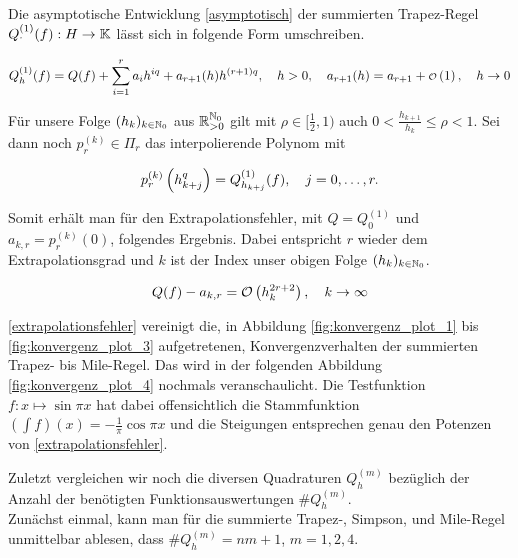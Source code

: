 Die asymptotische Entwicklung \eqref{asymptotisch} der summierten Trapez-Regel $Q_\cdot^{(1)}(f): H \to \mathbb{K}$ lässt sich in folgende Form umschreiben.

\begin{align*}
    Q_h^{(1)}(f) =
    Q(f) +
    \sum_{i=1}^r a_i h^{iq} +
    a_{r+1}(h) h^{(r+1) q}, \quad
    h > 0, \quad
    a_{r+1}(h)
    = a_{r+1} + {\scriptstyle \mathcal{O}} \left ( 1 \right ), \quad
    h \to 0
\end{align*}

Für unsere Folge $(h_k)_{k \in \mathbb{N}_0}$ aus $\mathbb{R}_{>0}^{\mathbb{N}_0}$ gilt mit $\rho \in [\frac{1}{2}, 1)$ auch $0 < \frac{h_{k+1}}{h_k} \leq \rho < 1$. Sei dann noch $p_r^{(k)} \in \Pi_r$ das interpolierende Polynom mit

\begin{align*}
    p_r^{(k)} \left ( h_{k+j}^q \right )
    = Q_{h_{k+j}}^{(1)}(f), \quad
    j = 0, \ldots, r.
\end{align*}

Somit erhält man für den Extrapolationsfehler, mit $Q = Q_0^{(1)}$ und $a_{k, r} = p_r^{(k)}(0)$, folgendes Ergebnis. Dabei entspricht $r$ wieder dem Extrapolationsgrad und $k$ ist der Index unser obigen Folge $(h_k)_{k \in \mathbb{N}_0}$.

\begin{align}
    Q(f) - a_{k, r}
    = \mathcal{O} \left ( h_k^{2r+2} \right ), \quad
    k \to \infty
    \label{extrapolationsfehler}
\end{align}

\eqref{extrapolationsfehler} vereinigt die, in Abbildung \ref{fig:konvergenz_plot_1} bis \ref{fig:konvergenz_plot_3} aufgetretenen, Konvergenzverhalten der summierten Trapez- bis Mile-Regel. Das wird in der folgenden Abbildung \ref{fig:konvergenz_plot_4} nochmals veranschaulicht. Die Testfunktion $f: x \mapsto \sin{\pi x}$ hat dabei offensichtlich die Stammfunktion $(\int f)(x) = - \frac{1}{\pi} \cos{\pi x}$ und die Steigungen entsprechen genau den Potenzen von \eqref{extrapolationsfehler}.



Zuletzt vergleichen wir noch die diversen Quadraturen $Q_h^{(m)}$ bezüglich der Anzahl der benötigten Funktionsauswertungen $\# Q_h^{(m)}$. \\

Zunächst einmal, kann man für die summierte Trapez-, Simpson, und Mile-Regel unmittelbar ablesen, dass $\# Q_h^{(m)} = nm + 1$, $m = 1, 2, 4$. \\

